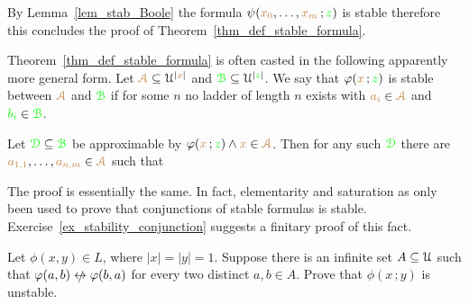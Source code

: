 \documentclass[creche.tex]{subfiles}
\begin{document}



By Lemma~\ref{lem_stab_Boole} the formula $\psi({\color{brown} x_0},\dots,{\color{brown} x_m}\,;{\color{green} z})$ is stable therefore this concludes the proof of Theorem~\ref{thm_def_stable_formula}.\QED 

\begin{remark}\label{rem_sability_no_compactness}
  Theorem~\ref{thm_def_stable_formula} is often casted in the following  apparently more general form.
  Let ${\color{brown}\EuScript A}\subseteq\EuScript U^{|{\color{brown} x}|}$ and ${\color{green}\EuScript B}\subseteq\EuScript U^{|{\color{green} z}|}$.
  We say that $\varphi({\color{brown} x}\,;{\color{green} z})$ is stable between ${\color{brown}\EuScript A}$ and ${\color{green}\EuScript B}$ if for some $n$ no ladder of length $n$ exists with ${\color{brown} a_i}\in{\color{brown}\EuScript A}$ and ${\color{green} b_i}\in{\color{green}\EuScript B}$.

  Let ${\color{green}\EuScript D}\subseteq{\color{green}\EuScript B}$ be approximable by $\varphi({\color{brown} x}\,;{\color{green} z})\wedge {\color{brown}x}\in{\color{brown}\EuScript A}$.
  Then for any such ${\color{green}\EuScript D}$ there are ${\color{brown} a_{1,1}},\dots,{\color{brown} a_{n,m}}\in {\color{brown}\EuScript A}$ such that 
  
  
  The proof is essentially the same. 
  In fact, elementarity and saturation as only been used to prove that conjunctions of stable formulas is stable.
  Exercise~\ref{ex_stability_conjunction} suggests a finitary proof of this fact.\QED
\end{remark} 

\begin{exercise}
  Let $\phi(x,y)\in  L$, where $|x|=|y|=1$.
  Suppose there is an infinite set $A\subseteq\EuScript U$ such that $\phi(a,b)\niff\phi(b,a)$ for every two distinct $a,b\in A$.
  Prove that $\phi(x\,;y)$ is unstable.\QED
\end{exercise}


  
\end{document}

